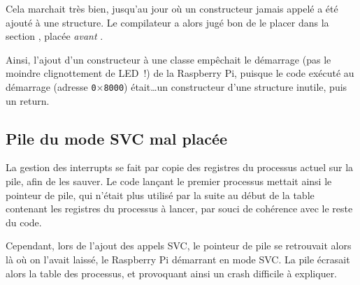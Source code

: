 \documentclass[11pt,a4paper]{article}
\newcommand{\hex}[1]{\texttt{0$\times$#1}}
\begin{document}
Cela marchait très bien, jusqu'au jour où un constructeur jamais appelé a été
ajouté à une structure. Le compilateur a alors jugé bon de le placer dans
la section , placée \emph{avant} .

Ainsi, l'ajout d'un constructeur à une classe empêchait le démarrage
(pas le moindre clignottement de LED~!) de la Raspberry Pi, puisque le code
exécuté au démarrage (adresse \hex{8000}) était\ldots un constructeur d'une
structure inutile, puis un return.

\subsection*{Pile du mode SVC mal placée}
La gestion des interrupts se fait par copie des registres du processus
actuel sur la pile, afin de les sauver. Le code lançant le premier
processus mettait ainsi le pointeur de pile, qui n'était plus utilisé
par la suite au début de la table contenant les registres du processus
à lancer, par souci de cohérence avec le reste du code.

Cependant, lors de l'ajout des appels SVC, le pointeur de pile se
retrouvait alors là où on l'avait laissé, le Raspberry Pi démarrant en
mode SVC. La pile écrasait alors la table des processus, et provoquant
ainsi un crash difficile à expliquer.
\end{document}
